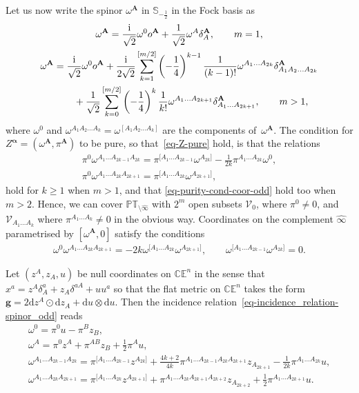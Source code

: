 \documentclass[pdftex]{sigma}
\numberwithin{equation}{section}
\newcommand{\mbf} [1]{\mathbf{#1}}
\newcommand{\mc} [1]{\mathcal{#1}}
\newcommand{\dd} {\mathrm{d}}
\newcommand{\ii} {\mathrm{i}}
\newcommand{\PT} {\mathbb{PT}}
\newcommand{\Ss} {\mathbb{S}}
\newcommand{\E} {\mathbb{E}}
\newcommand{\C} {\mathbb{C}}
\begin{document}
Let us now write the spinor $\omega^\mbf{A}$ in $\Ss_{-\frac{1}{2}}$ in the Fock basis as
\begin{gather}
\omega^{\mbf{A}} = \frac{\ii}{\sqrt{2}} \omega^0 o^{\mbf{A}} + \frac{1}{\sqrt{2}} \omega^A \delta_A^{\mbf{A}} , \qquad m = 1 ,\nonumber \\
\omega^{\mbf{A}} = \frac{\ii}{\sqrt{2}} \omega^0 o^{\mbf{A}}
+ \frac{\ii}{2\sqrt{2}} \sum_{k=1}^{[m/2]}\left(- \frac{1}{4}\right)^{k-1} \frac{1}{(k-1)!} \omega^{A_1\ldots A_{2k}} \delta_{A_1A_2\ldots A_{2k}}^{\mbf{A}}
\nonumber\\
\hphantom{\omega^{\mbf{A}} =}{} + \frac{1}{\sqrt{2}}\sum_{k=0}^{[m/2]}\left(- \frac{1}{4}\right)^k \frac{1}{k!} \omega^{A_1 \ldots A_{2k+1}} \delta_{A_1 \ldots A_{2k+1}}^{\mbf{A}} , \qquad m > 1 ,\label{eq-hom2gen-om_odd}
\end{gather}
where $\omega^0$ and $\omega^{A_1A_2\ldots A_{k}} = \omega^{[A_1A_2\ldots A_{k}]}$ are the components of~$\omega^\mbf{A}$. The condition for $Z^{\bm{\upalpha}}=(\omega^\mbf{A}, \pi^\mbf{A})$ to be pure, so that~\eqref{eq-Z-pure} hold, is that the relations
\begin{gather*}
\pi^0 \omega^{A_1 \ldots A_{2k-1} A_{2k}} = \pi^{[A_1 \ldots A_{2k-1}} \omega^{A_{2k}]} - \tfrac{1}{2k} \pi^{A_1 \ldots A_{2k}} \omega^0 , \\
\pi^0 \omega^{A_1 \ldots A_{2k} A_{2k+1}} = \pi ^{[A_1 \ldots A_{2k}} \omega^{A_{2k+1}]} ,
\end{gather*}
hold for $k\geq1$ when $m>1$, and that \eqref{eq-purity-cond-coor-odd} hold too when $m>2$. Hence, we can cover $\PT_{\setminus \widehat{\infty}}$ with $2^m$ open subsets $\mc{V}_0$, where $\pi^0 \neq 0$, and $\mc{V}_{A_1 \ldots A_{k}}$ where $\pi^{A_1 \ldots A_{k}} \neq 0$ in the obvious way. Coordinates on the complement $\widehat{\infty}$ parametrised by $[\omega^\mbf{A},0]$ satisfy the conditions
\begin{gather*}
\omega^0 \omega^{A_1 \ldots A_{2k} A_{2k+1}}= - 2k \omega^{[A_1 \ldots A_{2k}} \omega^{A_{2k+1}]},\qquad \omega^{[A_1 \ldots A_{2k-1}} \omega^{A_{2k}]} = 0 .
\end{gather*}

Let $( z^A,z_A, u )$ be null coordinates on $\C \E^n$ in the sense that $x^a = z^A \delta^a_A + z_A \delta^{aA} + u u^a$ so that the f\/lat metric on $\C \E^n$ takes the form $\bm{g} = 2 \dd z^{A} \odot \dd z_{A} + \dd u \otimes \dd u$. Then the incidence rela\-tion~\eqref{eq-incidence_relation-spinor_odd} reads
\begin{gather*}
\omega^0 = \pi^0 u - \pi^B z_B , \\
\omega^A = \pi^0 z^A + \pi^{AB} z_B + \tfrac{1}{2} \pi^A u , \\
\omega^{A_1 \ldots A_{2k-1} A_{2k}} = \pi^{[A_1 \ldots A_{2k-1}} z^{A_{2k}]} + \tfrac{4k+2}{4k} \pi^{A_1 \ldots A_{2k-1} A_{2k} A_{2k+1}} z_{A_{2k+1}} - \tfrac{1}{2k} \pi^{A_1 \ldots A_{2k}} u , \\
\omega^{A_1 \ldots A_{2k} A_{2k+1}} = \pi^{[A_1 \ldots A_{2k}} z^{A_{2k+1}]} + \pi^{A_1 \ldots A_{2k} A_{2k+1} A_{2k+2}} z_{A_{2k+2}} + \tfrac{1}{2} \pi^{A_1 \ldots A_{2k+1}} u .
\end{gather*}
\end{document}
